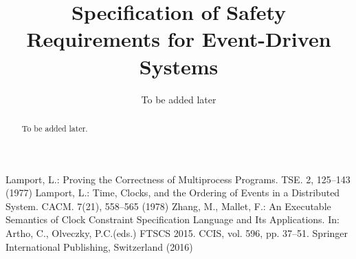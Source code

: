 \documentclass[11pt]{llncs}
\begin{document}
\title{Specification of Safety Requirements for Event-Driven Systems}
\author{To be added later}
\maketitle
\begin{abstract}
To be added later.
\end{abstract}
%

%

%

%

%

%

%

%
\begin{thebibliography}{00}
Lamport, L.:
Proving the Correctness of Multiprocess Programs.
TSE. 2, 125--143 (1977)
Lamport, L.:
Time, Clocks, and  the Ordering of Events in a  Distributed System.
CACM. 7(21), 558--565 (1978)
Zhang, M., Mallet, F.:
An Executable Semantics of Clock Constraint Specification Language and Its Applications.
In: Artho, C., Olveczky, P.C.(eds.) FTSCS 2015. CCIS, vol. 596, pp. 37--51.
Springer International Publishing, Switzerland (2016)
\end{thebibliography}
%
\end{document}
